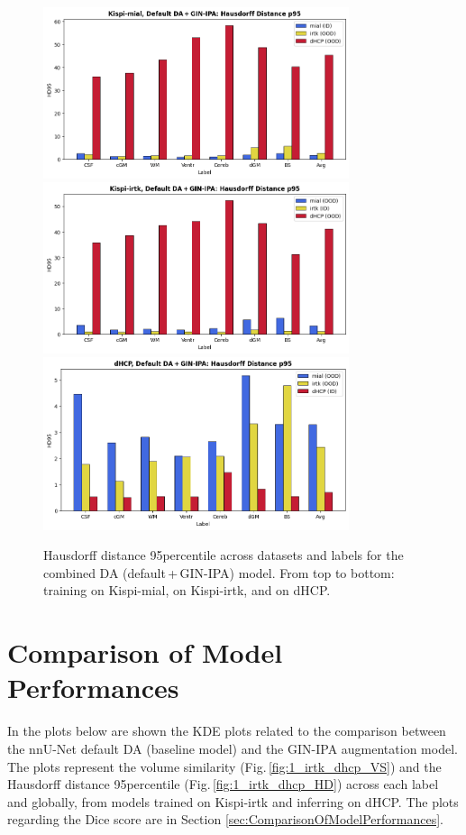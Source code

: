 \begin{figure}[htbp]
    \centering
    \includegraphics[width=0.8\textwidth]{figures/mial_both_HD.png}\\
    \vspace{2pt}
    \includegraphics[width=0.8\textwidth]{figures/irtk_both_HD.png}\\
    \vspace{2pt}
    \includegraphics[width=0.8\textwidth]{figures/dHCP_both_HD.png}
    \caption{Hausdorff distance 95\th percentile across datasets and labels for the combined DA (default\,+\,GIN-IPA) model. From top to bottom: training on Kispi-mial, on Kispi-irtk, and on dHCP.}
    \label{fig:both_HD}
\end{figure}

\section{Comparison of Model Performances}
In the plots below are shown the KDE plots related to the comparison between the nnU-Net default DA (baseline model) and the GIN-IPA augmentation model. The plots represent the volume similarity (Fig.\,\ref{fig:1_irtk_dhcp_VS}) and the Hausdorff distance 95\th percentile (Fig.\,\ref{fig:1_irtk_dhcp_HD}) across each label and globally, from models trained on Kispi-irtk and inferring on dHCP. The plots regarding the Dice score are in Section \ref{sec:ComparisonOfModelPerformances}.

